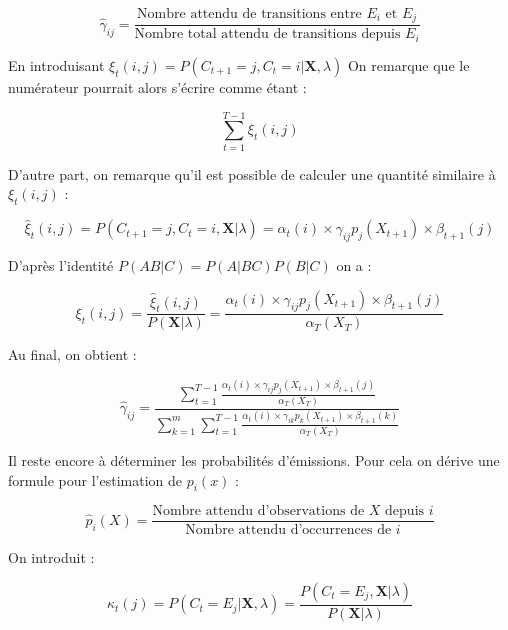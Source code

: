\documentclass[12pt, french]{report}
\begin{document}
\begin{equation}
\hat{\gamma}_{ij} = \frac{\text{Nombre attendu de transitions entre } E_i \text{ et } E_j}{\text{Nombre total attendu de transitions depuis }E_i}
\end{equation}

En introduisant $\xi_t(i,j) = P(C_{t+1}=j,C_t=i|\bm{X},\lambda)$  On remarque que le numérateur pourrait alors s'écrire comme étant :

\begin{equation}
\sum\limits_{t=1}^{T-1} \xi_t(i,j) 
\end{equation}

D'autre part, on remarque qu'il est possible de calculer une quantité similaire à $\xi_t(i,j)$ :

\begin{equation}
\hat{\xi}_t(i,j) = P(C_{t+1}=j,C_t=i,\bm{X}|\lambda) = \alpha_t(i) \times \gamma_{ij} p_j(X_{t+1}) \times \beta_{t+1}(j)
\end{equation}

D'après l'identité $P(AB|C)=P(A|BC)P(B|C)$ on a :

\begin{equation}
\xi_t(i,j) = \frac{\hat{\xi}_t(i,j)}{P(\bm{X}|\lambda)} = \frac{\alpha_t(i) \times \gamma_{ij} p_j(X_{t+1}) \times \beta_{t+1}(j)}{\alpha_T(X_T)}
\end{equation}

Au final, on obtient :

\begin{equation}
\hat{\gamma}_{ij} = 
\frac{\sum\limits_{t=1}^{T-1} \frac{\alpha_t(i) \times \gamma_{ij} p_j(X_{t+1}) \times \beta_{t+1}(j)}
{\alpha_T(X_T)}}
{\sum\limits_{k=1}^m \sum\limits_{t=1}^{T-1} \frac{\alpha_t(i) \times \gamma_{ik} p_k(X_{t+1}) \times \beta_{t+1}(k)}	   {\alpha_T(X_T)}}
\end{equation}

Il reste encore à déterminer les probabilités d'émissions. Pour cela on dérive une formule pour l'estimation de $p_i(x)$ : 

\begin{equation}
\hat{p}_i(X) = \frac{\text{Nombre attendu d'observations de }X\text{ depuis }i}
{\text{Nombre attendu d'occurrences  de }i}
\end{equation}

On introduit :

\begin{equation}
\kappa_t(j) = P(C_t=E_j|\bm{X},\lambda) = \frac{P(C_t=E_j,\bm{X}|\lambda)}{P(\bm{X}|\lambda)}
\end{equation} 
\end{document}
